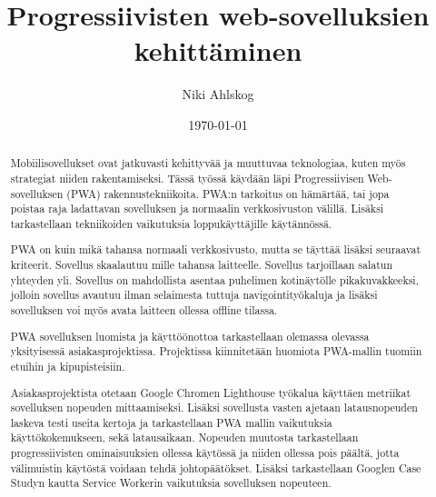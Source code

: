 \documentclass{tktltiki}
\begin{document}
\singlespacing

\title{Progressiivisten web-sovelluksien kehittäminen}
\author{Niki Ahlskog}

\date{\today}

\maketitle






\begin{abstract}

Mobiilisovellukset ovat jatkuvasti kehittyvää ja muuttuvaa teknologiaa, kuten myös strategiat niiden rakentamiseksi. Tässä työssä käydään läpi Progressiivisen Web-sovelluksen (PWA) rakennustekniikoita. PWA:n tarkoitus on hämärtää, tai jopa poistaa raja ladattavan sovelluksen ja normaalin verkkosivuston välillä. Lisäksi tarkastellaan tekniikoiden vaikutuksia loppukäyttäjille käytännössä.

PWA on kuin mikä tahansa normaali verkkosivusto, mutta se täyttää lisäksi seuraavat kriteerit. Sovellus skaalautuu mille tahansa laitteelle. Sovellus tarjoillaan salatun yhteyden yli. Sovellus on mahdollista asentaa puhelimen kotinäytölle pikakuvakkeeksi, jolloin sovellus avautuu ilman selaimesta tuttuja navigointityökaluja ja lisäksi sovelluksen voi myös avata laitteen ollessa offline tilassa. 

PWA sovelluksen luomista ja käyttöönottoa tarkastellaan olemassa olevassa yksityisessä asiakasprojektissa. Projektissa kiinnitetään huomiota PWA-mallin tuomiin etuihin ja kipupisteisiin.

Asiakasprojektista otetaan Google Chromen Lighthouse työkalua käyttäen metriikat sovelluksen nopeuden mittaamiseksi. Lisäksi sovellusta vasten ajetaan latausnopeuden laskeva testi useita kertoja ja tarkastellaan PWA mallin vaikutuksia käyttökokemukseen, sekä latausaikaan. Nopeuden muutosta tarkastellaan progressiivisten ominaisuuksien ollessa käytössä ja niiden ollessa pois päältä, jotta välimuistin käytöstä voidaan tehdä johtopäätökset. Lisäksi tarkastellaan Googlen Case Studyn kautta Service Workerin vaikutuksia sovelluksen nopeuteen. \end{abstract}
\end{document}

